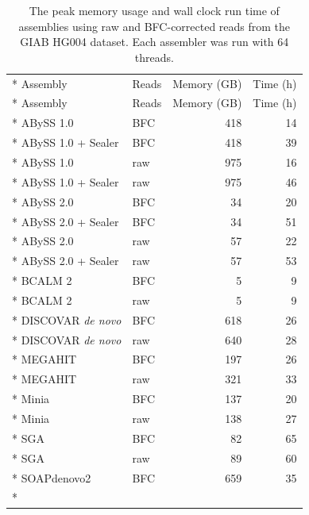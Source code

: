 \documentclass[
  12pt,
  oneside,
  openany]{book}
\begin{document}
\begin{appendices}
\hypertarget{tbl:rawmem}{}
\begin{singlespace}
\small
\begin{longtable}[]{@{}llrr@{}}
\caption[The peak memory usage and wall clock run time of assemblies using raw and BFC-corrected reads from the GIAB HG004 dataset.]{\label{tbl:rawmem}The peak memory usage and wall clock run time of assemblies using raw and BFC-corrected reads from the GIAB HG004 dataset. Each assembler was run with 64 threads.}\tabularnewline*
\toprule
Assembly & Reads & Memory (GB) & Time (h)\tabularnewline*
\midrule
\endfirsthead
\toprule
Assembly & Reads & Memory (GB) & Time (h)\tabularnewline*
\midrule
\endhead
ABySS 1.0 & BFC & 418 & 14\tabularnewline*
ABySS 1.0 + Sealer & BFC & 418 & 39\tabularnewline*
ABySS 1.0 & raw & 975 & 16\tabularnewline*
ABySS 1.0 + Sealer & raw & 975 & 46\tabularnewline*
ABySS 2.0 & BFC & 34 & 20\tabularnewline*
ABySS 2.0 + Sealer & BFC & 34 & 51\tabularnewline*
ABySS 2.0 & raw & 57 & 22\tabularnewline*
ABySS 2.0 + Sealer & raw & 57 & 53\tabularnewline*
BCALM 2 & BFC & 5 & 9\tabularnewline*
BCALM 2 & raw & 5 & 9\tabularnewline*
DISCOVAR \emph{de novo} & BFC & 618 & 26\tabularnewline*
DISCOVAR \emph{de novo} & raw & 640 & 28\tabularnewline*
MEGAHIT & BFC & 197 & 26\tabularnewline*
MEGAHIT & raw & 321 & 33\tabularnewline*
Minia & BFC & 137 & 20\tabularnewline*
Minia & raw & 138 & 27\tabularnewline*
SGA & BFC & 82 & 65\tabularnewline*
SGA & raw & 89 & 60\tabularnewline*
SOAPdenovo2 & BFC & 659 & 35\tabularnewline*
\bottomrule
\end{longtable}
\end{singlespace}


\end{appendices}
\end{document}
